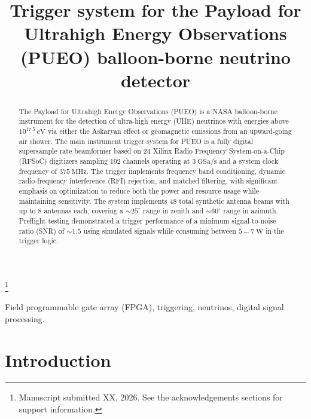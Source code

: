 \documentclass{IEEEtran}
\begin{document}
\title{Trigger system for the Payload for Ultrahigh Energy Observations (PUEO) balloon-borne neutrino detector}


\renewcommand\footnotemark{}
\renewcommand\footnoterule{}
\thanks{Manuscript submitted XX, 2026. See the acknowledgements sections for support information.}



\maketitle


\begin{abstract}
The Payload for Ultrahigh Energy Observations (PUEO) is a NASA balloon-borne
instrument for the detection of ultra-high energy (UHE) neutrinos with
energies above $10^{17.5}~\textrm{eV}$ via either the Askaryan effect or geomagnetic
emissions from an upward-going air shower. The main instrument trigger system
for PUEO is a fully digital supersample rate beamformer based on 24 Xilinx Radio
Frequency System-on-a-Chip (RFSoC) digitizers sampling 192 channels operating 
at $3~\textrm{GSa/s}$ and a system clock frequency of $375~\textrm{MHz}$. The
trigger implements frequency band conditioning, dynamic radio-frequency
interference (RFI) rejection, and matched filtering, with significant emphasis
on optimization to reduce both the power and resource usage while maintaining
sensitivity. The system implements 48 total synthetic antenna beams with
up to 8 antennas each, covering a $\sim25^\circ$ range in zenith and
$\sim60^\circ$ range in azimuth. Preflight testing demonstrated a trigger
performance of a minimum signal-to-noise ratio (SNR) of $\sim1.5$ using
simulated signals while consuming between $5-7~\textrm{W}$ in the trigger logic.
\end{abstract}

\begin{IEEEkeywords}
Field programmable gate array (FPGA), triggering, neutrinos, digital signal processing.
\end{IEEEkeywords}

\section{Introduction}
\end{document}
